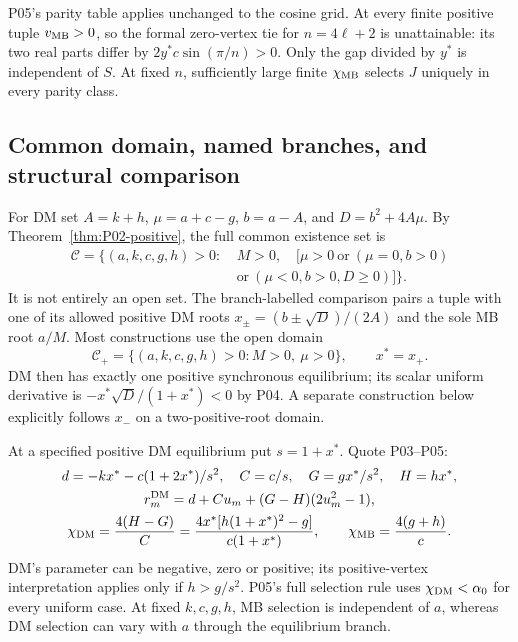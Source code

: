 P05's parity table applies unchanged to the cosine grid. At every finite
positive tuple $v_{\mathrm{MB}}>0$, so the formal zero-vertex tie for
$n=4\ell+2$ is unattainable: its two real parts differ by
$2y^*c\sin(\pi/n)>0$. Only the gap divided by $y^*$ is independent
of $S$. At fixed $n$, sufficiently large finite $\chi_{\mathrm{MB}}$ selects
$J$ uniquely in every parity class.

\subsection{Common domain, named branches, and structural comparison}
\label{slot:P08-5}
For DM set $A=k+h$, $\mu=a+c-g$, $b=a-A$, and $D=b^2+4A\mu$.
By Theorem~\ref{thm:P02-positive}, the full common existence set is
\begin{equation}
\begin{split}
 \mathcal C=\{(a,k,c,g,h)>0:\ &M>0,\quad
 [\mu>0\ \text{or}\ (\mu=0,b>0)\\
 &\text{or}\ (\mu<0,b>0,D\ge0)]\}.
\end{split}\label{eq:P08-common}
\end{equation}
It is not entirely an open set. The branch-labelled comparison pairs
a tuple with one of its allowed positive DM roots
$x_\pm=(b\pm\sqrt D)/(2A)$ and the sole MB root $a/M$.
Most constructions use the open domain
\begin{equation}
 \mathcal C_+=\{(a,k,c,g,h)>0:M>0,\ \mu>0\},\qquad x^*=x_+.
 \label{eq:P08-common-simple}
\end{equation}
DM then has exactly one positive synchronous equilibrium; its scalar
uniform derivative is $-x^*\sqrt D/(1+x^*)<0$ by P04. A separate
construction below explicitly follows $x_-$ on a two-positive-root domain.

At a specified positive DM equilibrium put $s=1+x^*$. Quote P03--P05:
\begin{equation}
\begin{gathered}
 d=-kx^*-c(1+2x^*)/s^2,\quad C=c/s,\quad G=gx^*/s^2,\quad H=hx^*,\\
 r_m^{\mathrm{DM}}=d+Cu_m+(G-H)(2u_m^2-1),\\
 \chi_{\mathrm{DM}}=\frac{4(H-G)}C
 =\frac{4x^*[h(1+x^*)^2-g]}{c(1+x^*)},\qquad
 \chi_{\mathrm{MB}}=\frac{4(g+h)}c.
\end{gathered}\label{eq:P08-DM-input}
\end{equation}
DM's parameter can be negative, zero or positive; its positive-vertex
interpretation applies only if $h>g/s^2$. P05's full selection rule uses
$\chi_{\mathrm{DM}}<\alpha_0$ for every uniform case. At fixed $k,c,g,h$,
MB selection is independent of $a$, whereas DM selection can vary with
$a$ through the equilibrium branch.

